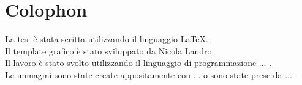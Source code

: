%
%
\chapter*{Colophon}

La tesi è stata scritta utilizzando il linguaggio LaTeX.\\
Il template grafico è stato sviluppato da Nicola Landro.\\
Il lavoro è stato svolto utilizzando il linguaggio di programmazione ... .\\
Le immagini sono state create appositamente con ... o sono state prese da ... .
